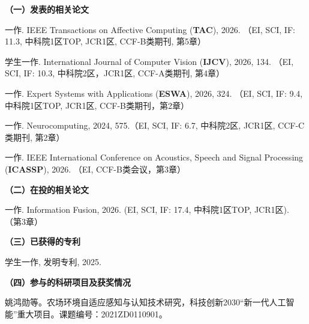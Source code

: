 
\begin{publication}
\noindent\textbf{（一）发表的相关论文}

\begin{publist}
\item 一作. IEEE Transactions on Affective Computing (\textbf{TAC}), 2026. （EI, SCI, IF: 11.3, 中科院1区TOP, JCR1区, CCF-B类期刊, 第5章）
\item 学生一作. International Journal of Computer Vision (\textbf{IJCV}), 2026, 134. （EI, SCI, IF: 10.3, 中科院2区，JCR1区, CCF-A类期刊, 第4章）
\item 一作. Expert Systems with Applications (\textbf{ESWA}), 2026, 324. （EI, SCI, IF: 9.4, 中科院1区TOP, JCR1区, CCF-B类期刊，第2章）
\item 一作. Neurocomputing, 2024, 575.（EI, SCI, IF: 6.7, 中科院2区, JCR1区, CCF-C类期刊, 第2章）
\item 一作. IEEE International Conference on Acoustics, Speech and Signal Processing (\textbf{ICASSP}), 2026. （EI, CCF-B类会议，第3章）
\end{publist}


\noindent\textbf{（二）在投的相关论文}

一作. Information Fusion, 2026. (EI, SCI, IF: 17.4, 中科院1区TOP, JCR1区). （第3章）

\noindent\textbf{（三）已获得的专利}

学生一作, 发明专利, 2025.

\noindent\textbf{（四）参与的科研项目及获奖情况}

姚鸿勋等。农场环境自适应感知与认知技术研究，科技创新2030“新一代人工智能”重大项目。课题编号：2021ZD0110901。

\end{publication}
